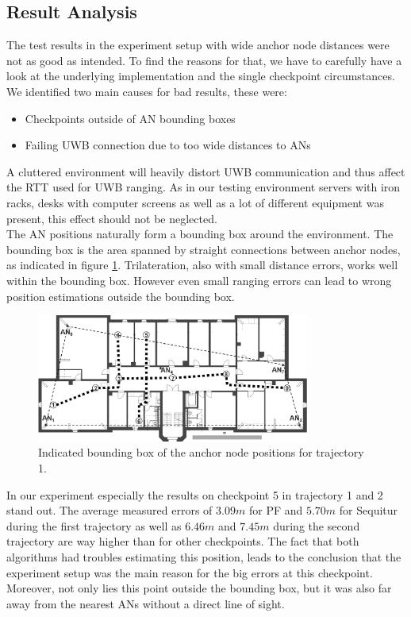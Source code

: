 \subsection{Result Analysis}
\label{Section2}
The test results in the experiment setup with wide anchor node distances were not as good as intended. To find the reasons for that, we have to carefully have a look at the underlying implementation and the single checkpoint circumstances. We identified two main causes for bad results, these were:
\begin{itemize}
\item Checkpoints outside of AN bounding boxes
\item Failing UWB connection due to too wide distances to ANs
\end{itemize}
A cluttered environment will heavily distort UWB communication and thus affect the RTT used for UWB ranging. As in our testing environment servers with iron racks, desks with computer screens as well as a lot of different equipment was present, this effect should not be neglected.\\
\noindent\hspace*{5mm}%
The AN positions naturally form a bounding box around the environment. The bounding box is the area spanned by straight connections between anchor nodes, as indicated in figure \ref{fig:trajectory1_boundingBox}. Trilateration, also with small distance errors, works well within the bounding box. However even small ranging errors can lead to wrong position estimations outside the bounding box. 
\begin{figure}[th]
\centering
\includegraphics[width=0.8\textwidth]{Figures/trajectory1_boundingBox}
\decoRule
\caption[Bounding Box and Checkpoints for Trajectory 1 ]{Indicated bounding box of the anchor node positions for trajectory 1.}
\label{fig:trajectory1_boundingBox}
\end{figure}
In our experiment especially the results on checkpoint 5 in trajectory 1 and 2 stand out. The average measured errors of $3.09m$ for PF and $5.70m$ for Sequitur during the first trajectory as well as $6.46m$ and $7.45m$ during the second trajectory are way higher than for other checkpoints. The fact that both algorithms had troubles estimating this position, leads to the conclusion that the experiment setup was the main reason for the big errors at this checkpoint. Moreover, not only lies this point outside the bounding box, but it was also far away from the nearest ANs without a direct line of sight.\\
